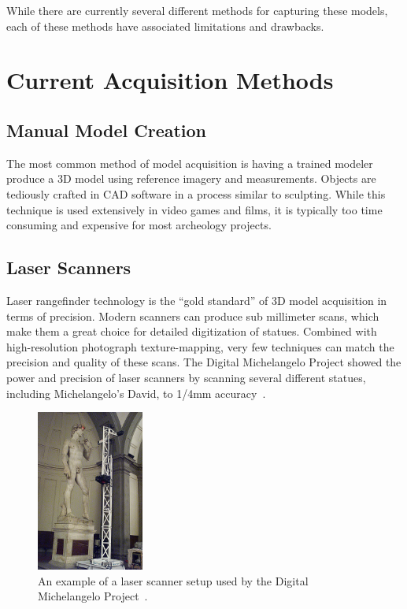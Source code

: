 While there are currently several different methods for capturing these models, each of these methods have associated limitations and drawbacks.


\section{Current Acquisition Methods}

\subsection{Manual Model Creation}
The most common method of model acquisition is having a trained modeler produce a 3D model using reference imagery and measurements. Objects are tediously crafted in CAD software in a process similar to sculpting. While this technique is used extensively in video games and films, it is typically too time consuming and expensive for most archeology projects.

\subsection{Laser Scanners}
Laser rangefinder technology is the ``gold standard'' of 3D model acquisition in terms of precision. Modern scanners can produce sub millimeter scans, which make them a great choice for detailed digitization of statues. Combined with high-resolution photograph texture-mapping, very few techniques can match the precision and quality of these scans. The Digital Michelangelo Project showed the power and precision of laser scanners by scanning several different statues, including Michelangelo's David, to 1/4mm accuracy~\cite{Levoy}.

\begin{figure}
\centering
\includegraphics[height=200px]{../images/david_scan.jpg}
\caption{An example of a laser scanner setup used by the Digital Michelangelo Project~\cite{Levoy}.}
\end{figure}

